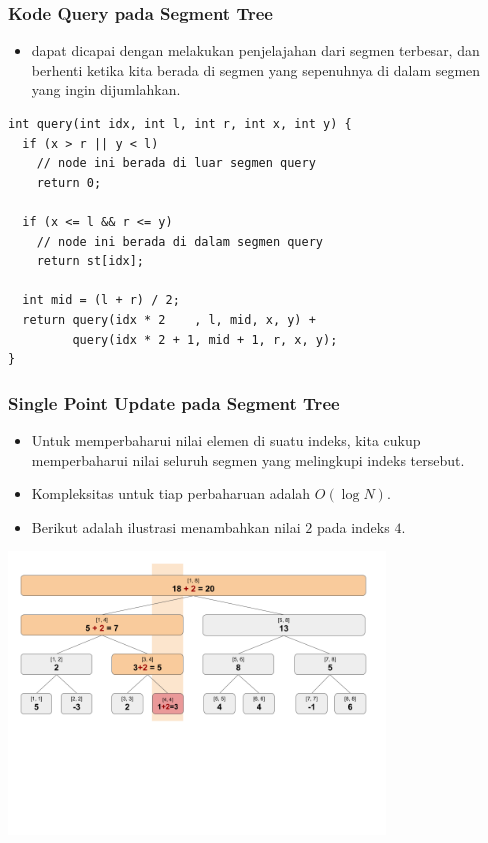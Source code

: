 \begin{frame}[fragile]
\frametitle{Kode Query pada Segment Tree}
\begin{itemize}
  \item \fQuery dapat dicapai dengan melakukan penjelajahan \fsegmentTree dari segmen terbesar, dan berhenti ketika kita berada di segmen yang sepenuhnya di dalam segmen yang ingin dijumlahkan.
\end{itemize}
\begin{lstlisting}
int query(int idx, int l, int r, int x, int y) {
  if (x > r || y < l)
    // node ini berada di luar segmen query
    return 0;

  if (x <= l && r <= y)
    // node ini berada di dalam segmen query
    return st[idx];
  
  int mid = (l + r) / 2;
  return query(idx * 2    , l, mid, x, y) +
         query(idx * 2 + 1, mid + 1, r, x, y);
}
\end{lstlisting}
\end{frame}

\begin{frame}
\frametitle{Single Point Update pada Segment Tree}
\begin{itemize}
  \item Untuk memperbaharui nilai elemen di suatu indeks, kita cukup memperbaharui nilai seluruh segmen yang melingkupi indeks tersebut.
  \item Kompleksitas untuk tiap perbaharuan adalah $O(\log N)$.
  \item Berikut adalah ilustrasi menambahkan nilai $2$ pada indeks $4$.
\end{itemize}
\begin{center}
  \includegraphics[width=10cm]{asset/segtree-update.png}
\end{center}
\end{frame}

